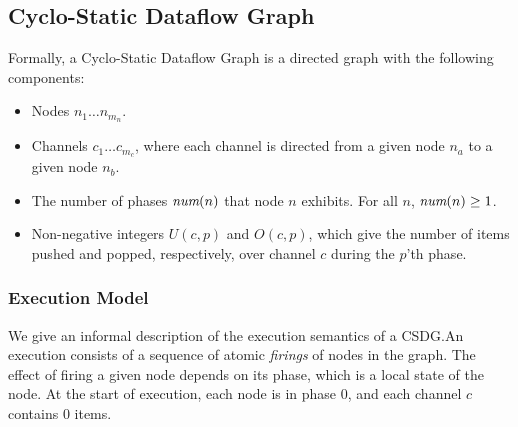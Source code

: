 \subsection{Cyclo-Static Dataflow Graph}
Formally, a Cyclo-Static Dataflow Graph is a directed graph with the
following components:
\begin{itemize}

\item Nodes $n_1 \dots n_{m_n}$.

\item Channels $c_1 \dots c_{m_c}$, where each channel is directed
from a given node $n_a$ to a given node $n_b$.

\item The number of phases $\mbox{\it num}(n)$ that node $n$ exhibits.  For
all $n$, $\mbox{\it num}(n) \ge 1$.

\item Non-negative integers $U(c, p)$ and $O(c, p)$, which give the
number of items pushed and popped, respectively, over channel $c$
during the $p$'th phase.


\end{itemize}

\subsubsection{Execution Model}

We give an informal description of the execution semantics of a
CSDG.An execution consists of a sequence of atomic {\it firings} of
nodes in the graph.  The effect of firing a given node depends on its
phase, which is a local state of the node.  At the start of execution,
each node is in phase 0, and each channel $c$ contains 0 items.

